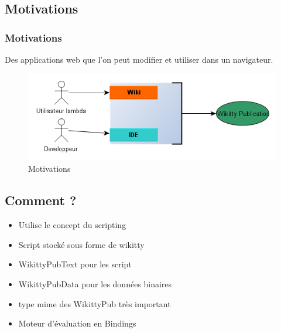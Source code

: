 \documentclass[12pt,a4paper,utf8x]{beamer}
\begin{document}
\subsection*{Motivations}
\begin{frame}\frametitle{Motivations}

Des applications web que l'on peut modifier et utiliser dans un navigateur.\pause


\begin{figure}\pause
\includegraphics[scale=0.5]{../image/wpwhy.png} 
\caption{Motivations}
\end{figure}

\end{frame}

\subsection*{Comment ?}
\begin{frame} 
\begin{itemize}
\item Utilise le concept du scripting
\item Script stocké sous forme de wikitty
\item WikittyPubText pour les script
\item WikittyPubData pour les données binaires
\item type mime des WikittyPub très important
\item Moteur d'évaluation en Bindings
\end{itemize}

\end{frame}
\end{document}
